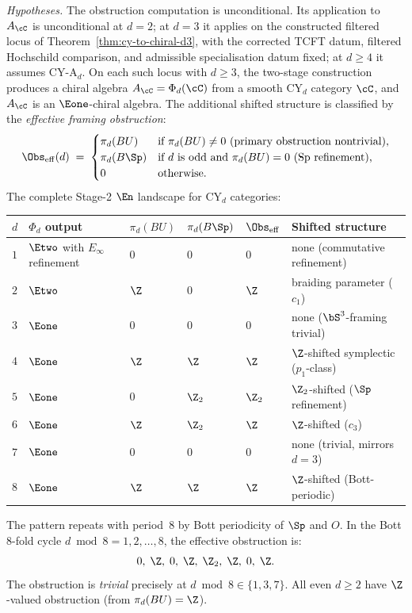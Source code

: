 \begin{theorem}
\label{thm:e1-stabilization-cy}
\noindent\emph{Hypotheses.} The obstruction computation is unconditional. Its application to $A_\cC$ is unconditional at $d = 2$; at $d = 3$ it applies on the constructed filtered locus of Theorem~\ref{thm:cy-to-chiral-d3}, with the corrected TCFT datum, filtered Hochschild comparison, and admissible specialisation datum fixed; at $d \geq 4$ it assumes CY-A$_d$.
On each such locus with $d \geq 3$, the two-stage construction produces a chiral algebra $A_\cC = \Phi_d(\cC)$ from a smooth CY$_d$ category $\cC$, and $A_\cC$ is an $\Eone$-chiral algebra. The additional shifted structure is classified by the \emph{effective framing obstruction}:
\[
 \Obs_{\mathrm{eff}}(d) \;=\;
 \begin{cases}
 \pi_d(BU) & \text{if $\pi_d(BU) \neq 0$ (primary obstruction nontrivial),} \\
 \pi_d(B\Sp) & \text{if $d$ is odd and $\pi_d(BU) = 0$ (Sp refinement),} \\
 0 & \text{otherwise.}
 \end{cases}
\]
The complete Stage-2 $\En$ landscape for CY$_d$ categories:
\begin{center}
\renewcommand{\arraystretch}{1.3}
\small
\begin{tabular}{llllll}
 \toprule
 $d$ & $\Phi_d$ output & $\pi_d(BU)$ & $\pi_d(B\Sp)$ & $\Obs_{\mathrm{eff}}$ & Shifted structure \\
 \midrule
 $1$ & $\Etwo$ with $E_\infty$ refinement & $0$ & $0$ & $0$ & none (commutative refinement) \\
 $2$ & $\Etwo$ & $\Z$ & $0$ & $\Z$ & braiding parameter ($c_1$) \\
 $3$ & $\Eone$ & $0$ & $0$ & $0$ & none ($\bS^3$-framing trivial) \\
 $4$ & $\Eone$ & $\Z$ & $\Z$ & $\Z$ & $\Z$-shifted symplectic ($p_1$-class) \\
 $5$ & $\Eone$ & $0$ & $\Z_2$ & $\Z_2$ & $\Z_2$-shifted ($\Sp$ refinement) \\
 $6$ & $\Eone$ & $\Z$ & $\Z_2$ & $\Z$ & $\Z$-shifted ($c_3$) \\
 $7$ & $\Eone$ & $0$ & $0$ & $0$ & none (trivial, mirrors $d = 3$) \\
 $8$ & $\Eone$ & $\Z$ & $\Z$ & $\Z$ & $\Z$-shifted (Bott-periodic) \\
 \bottomrule
\end{tabular}
\end{center}
The pattern repeats with period~$8$ by Bott periodicity of $\Sp$ and $O$. In the Bott $8$-fold cycle $d \bmod 8 = 1, 2, \ldots, 8$, the effective obstruction is:
\[
 0, \; \Z, \; 0, \; \Z, \; \Z_2, \; \Z, \; 0, \; \Z.
\]
The obstruction is \emph{trivial} precisely at $d \bmod 8 \in \{1, 3, 7\}$. All even $d \geq 2$ have $\Z$-valued obstruction (from $\pi_d(BU) = \Z$).
\end{theorem}

